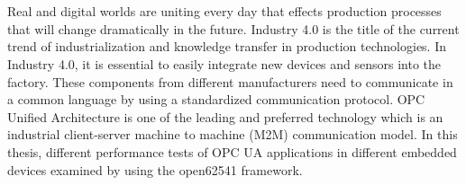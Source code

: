 \chapter{\abstractname}
Real and digital worlds are uniting every day that effects production processes that will change dramatically in the future. Industry 4.0 is the title of the current trend of industrialization and knowledge transfer in production technologies. In Industry 4.0, it is essential to easily integrate new devices and sensors into the factory. These components from different manufacturers need to communicate in a common language by using a standardized communication protocol.  OPC Unified Architecture is one of the leading and preferred technology which is an industrial client-server machine to machine (M2M) communication model.  In this thesis, different performance tests of OPC UA applications in different embedded devices examined by using the open62541 framework.


